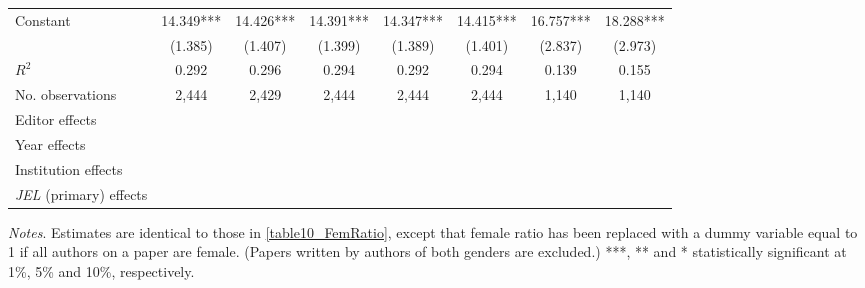 \begin{table}
\begin{adjustwidth}{-0.085cm}{}
\begin{threeparttable}
\begin{tabular}{p{2.64cm}SSSSSSS}
            Constant                      &      14.349***&      14.426***&      14.391***&      14.347***&      14.415***&      16.757***&      18.288***\\
                                          &     (1.385)   &     (1.407)   &     (1.399)   &     (1.389)   &     (1.401)   &     (2.837)   &     (2.973)   \\
            \midrule
            \(R^2\)                       &       0.292   &       0.296   &       0.294   &       0.292   &       0.294   &       0.139   &       0.155   \\
            No. observations              &       2,444   &       2,429   &       2,444   &       2,444   &       2,444   &       1,140   &       1,140   \\
            \midrule
            Editor effects        &           {}   &           {}   &           {}   &           {}   &           {}   &           {}   &           {}   \\
            Year effects                  &           {}   &           {}   &           {}   &           {}   &           {}   &           {}   &           {}   \\
            Institution effects           &           {}   &           {}   &           {}   &           {}   &           {}   &           {}   &           {}   \\
            \textit{JEL} (primary) effects&               &               &               &               &               &               &           {}   \\
            \bottomrule
        \end{tabular}
        \begin{tablenotes}
            \tiny
            \item \textit{Notes}. Estimates are identical to those in \autoref{table10_FemRatio}, except that female ratio has been replaced with a dummy variable equal to 1 if all authors on a paper are female. (Papers written by authors of both genders are excluded.) ***, ** and * statistically significant at 1\%, 5\% and 10\%, respectively.
        \end{tablenotes}
    \end{threeparttable}
    \end{adjustwidth}
\end{table}
